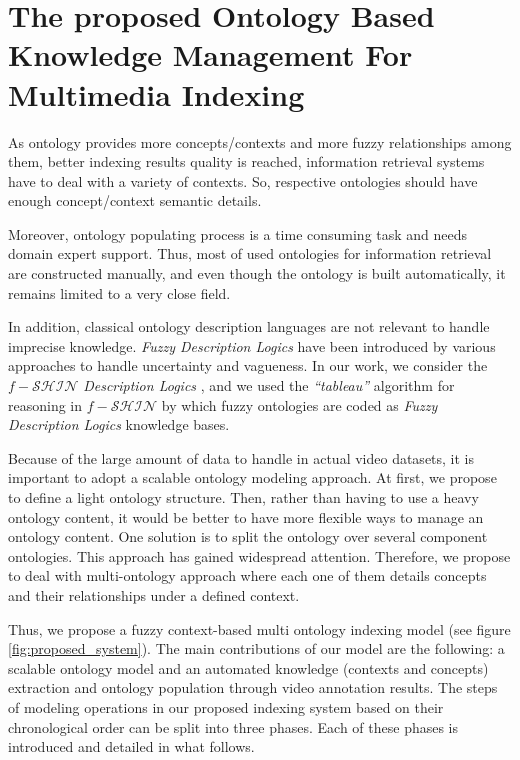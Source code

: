\section{The proposed Ontology Based Knowledge Management For Multimedia Indexing}



As ontology provides more concepts/contexts and more fuzzy 
		relationships among them, better indexing results quality is reached, information 
		retrieval systems have to deal with a variety of contexts. 
		So, respective ontologies should have enough concept/context semantic details.

		Moreover, ontology populating process is a time consuming task and needs
		domain expert support.
		Thus, most of used ontologies for information retrieval are constructed manually, 
		and even though the ontology is built automatically, it remains limited to a very close field.

		In addition, classical ontology description languages are not relevant to handle imprecise knowledge. 
		\emph{Fuzzy Description Logics} have been introduced by various approaches to handle uncertainty 
		and vagueness. In our work, we consider the $f-\mathcal{SHIN}$ \emph{Description Logics} \cite{Stoilos2005},
		and we used the \emph{``tableau''} algorithm \cite{Stoilos2005} for reasoning in
		$f-\mathcal{SHIN}$ by which fuzzy ontologies are coded as \emph{Fuzzy Description Logics} knowledge bases.

		Because of the large amount of data to handle in actual video
		datasets, it is important to adopt a scalable ontology modeling approach. 
		At first, we propose to define a light ontology structure. Then, rather than
		having to use a heavy ontology content, it would be better to have more 
		flexible ways to manage an ontology content. One solution is to split the ontology
		over several component ontologies. This approach has gained widespread attention. 
		Therefore, we propose to deal with multi-ontology approach where each
		one of them details concepts and their relationships under a defined context. 

		Thus, we propose a fuzzy context-based multi ontology indexing model 
		(see figure \ref{fig:proposed_system}). The main contributions of our model are the following: 
		a scalable ontology model and an automated knowledge (contexts and concepts) extraction and 
		ontology population through video annotation results.
		The steps of modeling operations in our proposed indexing system based on their chronological 
		order can be split into three phases. Each of these phases is
		introduced and detailed in what follows.
		
